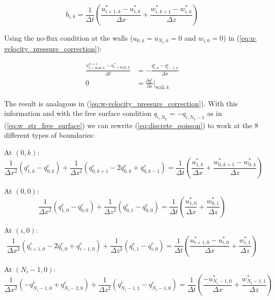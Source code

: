 \documentclass[12pt]{article}
\begin{document}
\begin{equation*}
b_{i,k} = \frac{1}{\Delta t} \left( \frac{u_{i+1,k}^* - u_{i,k}^*}{\Delta x}  + \frac{w_{i,k+1}^* - w_{i,k}^*}{\Delta z}\right)
\end{equation*}

Using the no-flux condition at the walls ($u_{0,k}=u_{N_i,k}=0$ and $w_{i,0} = 0$) in (\ref{eq:u-velocity_pressure_correction}):

\begin{align*}
\frac{u_{i=\text{wall},k}^{n+1} - u_{i=\text{wall},k}^*}{\Delta t} &= -\frac{q_{i,k}^c - q_{i-1,k}^c}{\Delta x}
\\
0 &= \frac{\partial q^c}{\partial x} \bigg|_{\text{wall},k}
\end{align*}

The result is analagous in (\ref{eq:w-velocity_pressure_correction}). With this information and with the free surface condition $q_{i,N_k}=-q_{i,N_k-1}$ as in (\ref{eq:w_str_free_surface}) we can rewrite (\ref{eq:discrete_poisson}) to work at the 8 different types of boundaries:

At $(0,k)$:
\begin{equation*}
\frac{1}{\Delta x^2} (q_{1,k}^c - q_{0,k}^c) 
+ \frac{1}{\Delta z^2} (q_{0,k+1}^c- 2 q_{0,k}^c + q_{0,k-1}^c) = \frac{1}{\Delta t} \left( \frac{u_{1,k}^*}{\Delta x}  + \frac{w_{0,k+1}^* - w_{0,k}^*}{\Delta z}\right)
\end{equation*}

At $(0,0)$:
\begin{equation*}
\frac{1}{\Delta x^2} (q_{1,0}^c -  q_{0,0}^c) 
+ \frac{1}{\Delta z^2} (q_{0,1}^c-  q_{0,0}^c) = \frac{1}{\Delta t} \left( \frac{u_{1,0}^*}{\Delta x}  + \frac{w_{0,1}^*}{\Delta z}\right)
\end{equation*}

At $(i,0)$:
\begin{equation*}
\frac{1}{\Delta x^2} (q_{i+1,0}^c - 2 q_{i,0}^c + q_{i-1,0}^c) 
+ \frac{1}{\Delta z^2} (q_{i,1}^c- q_{i,0}^c) = \frac{1}{\Delta t} \left( \frac{u_{i+1,0}^* - u_{i,0}^*}{\Delta x}  + \frac{w_{i,1}^*}{\Delta z}\right)
\end{equation*}

At $(N_i-1,0)$:
\begin{equation*}
\frac{1}{\Delta x^2} ( -  q_{N_i-1,0}^c + q_{N_i-2,0}^c) 
+ \frac{1}{\Delta z^2} (q_{N_i-1,1}^c-  q_{N_i-1,0}^c) = \frac{1}{\Delta t} \left( \frac{- u_{N_i-1,0}^*}{\Delta x}  + \frac{w_{N_i-1,1}^* }{\Delta z}\right)
\end{equation*}
\end{document}
